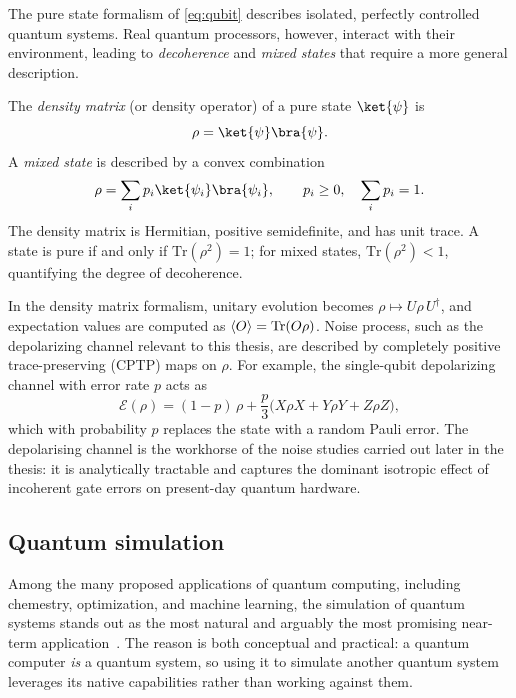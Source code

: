 The pure state formalism of \cref{eq:qubit} describes isolated, perfectly
controlled quantum systems. Real quantum processors, however, interact with their
environment, leading to \emph{decoherence} and \emph{mixed states} that require a
more general description.

The \emph{density matrix} (or density operator) of a pure state
$\ket{\psi}$ is
\begin{equation}
  \label{eq:density_pure}
  \rho = \ket{\psi}\bra{\psi}.
\end{equation}
A \emph{mixed state} is described by a convex combination
\begin{equation}
  \label{eq:density_mixed}
  \rho = \sum_i p_i \ket{\psi_i}\bra{\psi_i},
  \qquad p_i \geq 0,\quad \sum_i p_i = 1.
\end{equation}
The density matrix is Hermitian, positive semidefinite, and has unit trace. A
state is pure if and only if $\mathrm{Tr}(\rho^2) = 1$; for mixed states,
$\mathrm{Tr}(\rho^2) < 1$, quantifying the degree of decoherence.

In the density matrix formalism, unitary evolution becomes
$\rho \mapsto U\rho\, U^\dagger$, and expectation values are computed as
$\left\langle O\right\rangle=\mathrm{Tr}(O\rho)$. Noise process, such as the depolarizing
channel relevant to this thesis, are described by completely positive
trace-preserving (CPTP) maps on $\rho$. For example, the single-qubit
depolarizing channel with error rate $p$ acts as
\begin{equation}
  \label{eq:depolarizing}
  \mathcal{E}(\rho) = (1-p)\,\rho + \frac{p}{3}
    \bigl(X\rho X + Y\rho Y + Z\rho Z\bigr),
\end{equation}
which with probability $p$ replaces the state with a random Pauli error.
The depolarising channel is the workhorse of the noise studies carried out
later in the thesis: it is analytically tractable and captures the dominant
isotropic effect of incoherent gate errors on present-day quantum hardware.


\subsection{Quantum simulation}
\label{sec:qsim}

Among the many proposed applications of quantum computing, including
chemestry, optimization, and machine learning, the simulation of quantum
systems stands out as the most natural and arguably the most promising near-term
application~\cite{feynman1982,preskill2018}. The reason is both conceptual and
practical: a quantum computer \emph{is} a quantum system, so using it to simulate
another quantum system leverages its native capabilities rather than working
against them.

